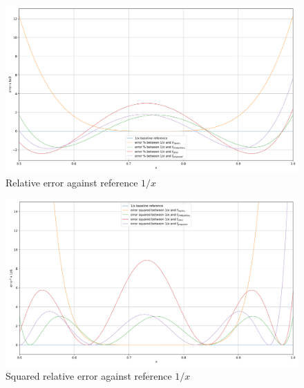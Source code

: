 \begin{figure}
    \includegraphics[width=1\textwidth]{figures/reciprocate_real_vs_taylor_vs_drom_error.pdf}\caption{Relative error against reference $1/x$}\label{fig:relative_error_00001}
\end{figure}
\begin{figure}
    \includegraphics[width=1\textwidth]{figures/reciprocate_real_vs_taylor_vs_drom_error_squared.pdf} 
    \caption{Squared relative error against reference $1/x$}
    \label{fig:020301280980435232835} 
\end{figure} 

